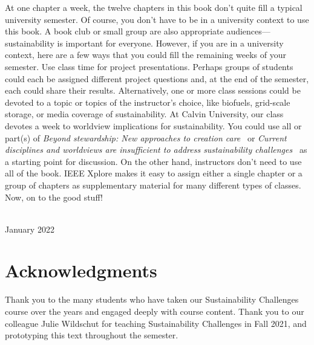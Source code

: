 {At one chapter a week, the twelve chapters in this book don't quite fill a typical 
university semester. 
Of course, you don't have to be in a university context to use this book. 
A book club or small group are also appropriate audiences---sustainability 
is important for everyone. 
However, if you are in a university context, here are a few ways that you could fill the 
remaining weeks of your semester. 
Use class time for project presentations. 
Perhaps groups of students could each be assigned different project questions and, 
at the end of the semester, each could share their results.
Alternatively, one or more class sessions could be devoted to a topic or topics 
of the instructor's choice, like biofuels, grid-scale storage, 
or media coverage of sustainability. 
At Calvin University, our class devotes a week to worldview implications for 
sustainability. 
You could use all or part(s) of \emph{Beyond stewardship: New approaches to 
creation care}~\citep{Warners:2019aa}
or \emph{Current disciplines and worldviews are insufficient
to address sustainability challenges}~\cite{VanH2019} as a starting point for discussion. 
On the other hand, instructors don't need to use all of the book. 
IEEE Xplore makes it easy to assign either a single chapter or a group of chapters 
as supplementary material for many different types of classes.
Now, on to the good stuff!

\vspace*{2pc}
\noindent\AUTHORS\\
\noindent January 2022
}

\cleardoublepage




\chapter*{Acknowledgments}

\thispagestyle{plain}

\noindent
Thank you to the many students who have taken our Sustainability Challenges course 
over the years and engaged deeply with course content.
Thank you to our colleague Julie Wildschut for teaching Sustainability Challenges in Fall 2021,
and prototyping this text throughout the semester.

